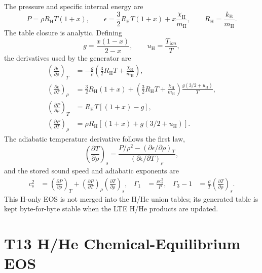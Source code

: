 \documentclass[11pt]{article}
\newcommand{\kb}{k_{\mathrm B}}
\newcommand{\mh}{m_{\mathrm H}}
\newcommand{\eps}{\epsilon}
\newcommand{\gammathree}{\Gamma_3-1}
\begin{document}
The pressure and specific internal energy are
\begin{equation}
  P = \rho R_{\mathrm H}T(1+x),
  \qquad
  \eps = \frac{3}{2}R_{\mathrm H}T(1+x)
       + x\frac{\chi_{\mathrm H}}{\mh},
  \qquad
  R_{\mathrm H}=\frac{\kb}{\mh}.
\end{equation}
The table closure is analytic.  Defining
\begin{equation}
  g=\frac{x(1-x)}{2-x}, \qquad u_{\mathrm H}=\frac{T_{\mathrm ion}}{T},
\end{equation}
the derivatives used by the generator are
\begin{align}
  \left(\frac{\partial \eps}{\partial \rho}\right)_T
    &= -\frac{g}{\rho}
       \left(\frac{3}{2}R_{\mathrm H}T+\frac{\chi_{\mathrm H}}{\mh}\right),
\\
  \left(\frac{\partial \eps}{\partial T}\right)_\rho
    &= \frac{3}{2}R_{\mathrm H}(1+x)
       +\left(\frac{3}{2}R_{\mathrm H}T+\frac{\chi_{\mathrm H}}{\mh}\right)
        \frac{g(3/2+u_{\mathrm H})}{T},
\\
  \left(\frac{\partial P}{\partial \rho}\right)_T
    &= R_{\mathrm H}T\left[(1+x)-g\right],
\\
  \left(\frac{\partial P}{\partial T}\right)_\rho
    &= \rho R_{\mathrm H}\left[(1+x)+g(3/2+u_{\mathrm H})\right].
\end{align}
The adiabatic temperature derivative follows the first law,
\begin{equation}
  \left(\frac{\partial T}{\partial \rho}\right)_s =
  \frac{P/\rho^2-(\partial\eps/\partial\rho)_T}
       {(\partial\eps/\partial T)_\rho},
\end{equation}
and the stored sound speed and adiabatic exponents are
\begin{align}
  c_s^2 &=
  \left(\frac{\partial P}{\partial \rho}\right)_T
  +\left(\frac{\partial P}{\partial T}\right)_\rho
   \left(\frac{\partial T}{\partial \rho}\right)_s,
&
  \Gamma_1 &= \frac{\rho c_s^2}{P},
&
  \gammathree &= \frac{\rho}{T}
   \left(\frac{\partial T}{\partial \rho}\right)_s.
\end{align}
This H-only EOS is not merged into the H/He union tables; its generated table is
kept byte-for-byte stable when the LTE H/He products are updated.

\section{T13 H/He Chemical-Equilibrium EOS}
\end{document}
